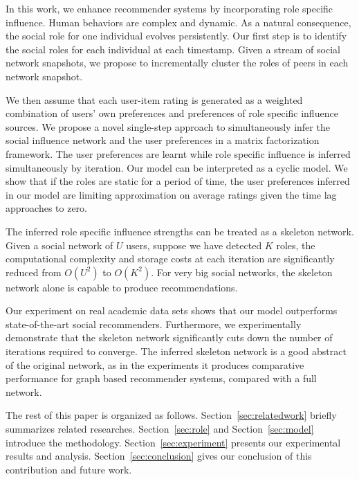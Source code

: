 \documentclass{ieeeaccess}
\begin{document}
In this work, we enhance recommender systems by incorporating role specific influence. Human behaviors are complex and dynamic. As a natural consequence, the social role for one individual evolves persistently. Our first step is to identify the social roles for each individual at each timestamp. Given a stream of social network snapshots, we propose to incrementally cluster the roles of peers in each network snapshot.

We then assume that each user-item rating is generated as a weighted combination of users' own preferences and preferences of role specific influence sources. We propose a novel single-step approach to simultaneously infer the social influence network and the user preferences in a matrix factorization framework. The user preferences are learnt while role specific influence is inferred simultaneously by iteration. Our model can be interpreted as a cyclic model. We show that if the roles are static for a period of time, the user preferences inferred in our model are limiting approximation on average ratings given the time lag approaches to zero. %

The inferred role specific influence strengths can be treated as a skeleton network. Given a social network of $U$ users, suppose we have detected $K$ roles, the computational complexity and storage costs at each iteration are significantly reduced from $O(U^2)$ to $O(K^2)$. For very big social networks, the skeleton network alone is capable to produce recommendations.


Our experiment on real academic data sets shows that our model outperforms state-of-the-art social recommenders. Furthermore, we experimentally demonstrate that the skeleton network significantly cuts down the number of iterations required to converge. The inferred skeleton network is a good abstract of the original network, as in the experiments it produces comparative performance for graph based recommender systems, compared with a full network.

The rest of this paper is organized as follows. Section~\ref{sec:relatedwork} briefly summarizes related researches. Section~\ref{sec:role} and Section~\ref{sec:model} introduce the methodology. Section~\ref{sec:experiment} presents our experimental results and analysis. Section~\ref{sec:conclusion} gives our conclusion of this contribution and future work.
\end{document}
